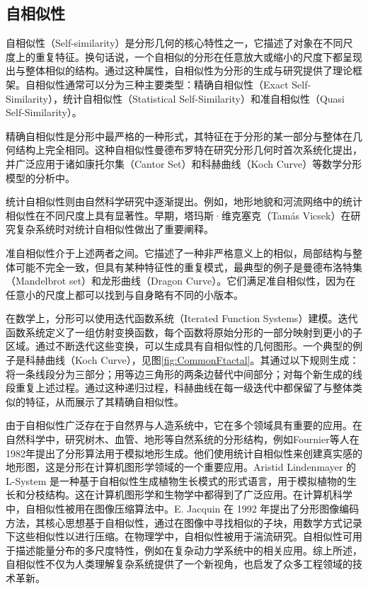 \subsection{自相似性}
自相似性（Self-similarity）是分形几何的核心特性之一，它描述了对象在不同尺度上的重复特征。换句话说，一个自相似的分形在任意放大或缩小的尺度下都呈现出与整体相似的结构。通过这种属性，自相似性为分形的生成与研究提供了理论框架。自相似性通常可以分为三种主要类型：精确自相似性（Exact Self-Similarity），统计自相似性（Statistical Self-Similarity）和准自相似性（Quasi Self-Similarity）。

精确自相似性是分形中最严格的一种形式，其特征在于分形的某一部分与整体在几何结构上完全相同。这种自相似性曼德布罗特\cite{Mandelbrot1982}在研究分形几何时首次系统化提出，并广泛应用于诸如康托尔集（Cantor Set）\cite{georg1883uber}和科赫曲线（Koch Curve）\cite{koch1904courbe}等数学分形模型的分析中。

统计自相似性则由自然科学研究中逐渐提出。例如，地形地貌和河流网络中的统计相似性在不同尺度上具有显著性。早期，塔玛斯·维克塞克（Tamás Vicsek）在研究复杂系统时对统计自相似性做出了重要阐释\cite{barabasi1991multifractality}。

准自相似性介于上述两者之间。它描述了一种非严格意义上的相似，局部结构与整体可能不完全一致，但具有某种特征性的重复模式，最典型的例子是曼德布洛特集（Mandelbrot set）和龙形曲线（Dragon Curve）。它们满足准自相似性，因为在任意小的尺度上都可以找到与自身略有不同的小版本。

在数学上，分形可以使用迭代函数系统（Iterated Function Systems）建模。迭代函数系统定义了一组仿射变换函数，每个函数将原始分形的一部分映射到更小的子区域。通过不断迭代这些变换，可以生成具有自相似性的几何图形。一个典型的例子是科赫曲线（Koch Curve）\cite{koch1904courbe}，见图\ref{fig:CommonFtactal}。其通过以下规则生成：将一条线段分为三部分；用等边三角形的两条边替代中间部分；对每个新生成的线段重复上述过程。通过这种递归过程，科赫曲线在每一级迭代中都保留了与整体类似的特征，从而展示了其精确自相似性。

由于自相似性广泛存在于自然界与人造系统中，它在多个领域具有重要的应用。在自然科学中，研究树木、血管、地形等自然系统的分形结构，例如Fournier等人在1982年提出了分形算法用于模拟地形生成。他们使用统计自相似性来创建真实感的地形图，这是分形在计算机图形学领域的一个重要应用\cite{fournier1982computer}。Aristid Lindenmayer 的 L-System 是一种基于自相似性生成植物生长模式的形式语言，用于模拟植物的生长和分枝结构。这在计算机图形学和生物学中都得到了广泛应用\cite{lindenmayer1968mathematical}。在计算机科学中，自相似性被用在图像压缩算法中。E. Jacquin 在 1992 年提出了分形图像编码方法，其核心思想基于自相似性，通过在图像中寻找相似的子块，用数学方式记录下这些相似性以进行压缩\cite{jacquin1992image}。在物理学中，自相似性被用于湍流研究。自相似性可用于描述能量分布的多尺度特性，例如在复杂动力学系统中的相关应用\cite{feder2013fractals}。综上所述，自相似性不仅为人类理解复杂系统提供了一个新视角，也启发了众多工程领域的技术革新。

